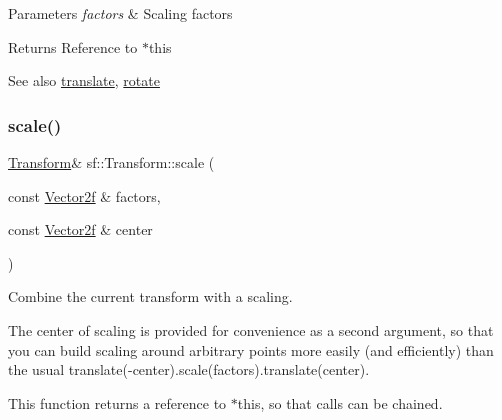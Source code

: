 \begin{DoxyParams}{Parameters}
{\em factors} & Scaling factors\\
\hline
\end{DoxyParams}
\begin{DoxyReturn}{Returns}
Reference to $\ast$this
\end{DoxyReturn}
\begin{DoxySeeAlso}{See also}
\mbox{\hyperlink{classsf_1_1_transform_ab54f6c8070cc05e2afcb3145fbf4395a}{translate}}, \mbox{\hyperlink{classsf_1_1_transform_a3e548c3c9e3fb9d4bd43cf852669e555}{rotate}} \begin{DoxyVerb}\end{DoxyVerb}
 
\end{DoxySeeAlso}
\mbox{\label{classsf_1_1_transform_a9198da375173127901f3095e0165ee1b}} 
\subsubsection{\texorpdfstring{scale()}{scale()}\hspace{0.1cm}{\footnotesize\ttfamily [4/4]}}
{\footnotesize\ttfamily \mbox{\hyperlink{classsf_1_1_transform}{Transform}}\& sf\+::\+Transform\+::scale (\begin{DoxyParamCaption}\item[{const \mbox{\hyperlink{classsf_1_1_vector2}{Vector2f}} \&}]{factors,  }\item[{const \mbox{\hyperlink{classsf_1_1_vector2}{Vector2f}} \&}]{center }\end{DoxyParamCaption})}



Combine the current transform with a scaling. 

The center of scaling is provided for convenience as a second argument, so that you can build scaling around arbitrary points more easily (and efficiently) than the usual translate(-\/center).scale(factors).translate(center).

This function returns a reference to $\ast$this, so that calls can be chained. 
\begin{DoxyCode}{0}
\end{DoxyCode}



